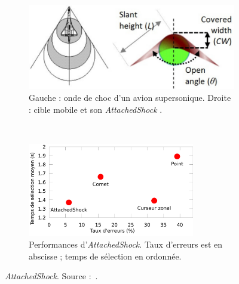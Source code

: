 	\begin{figure}[htbp]
		\centering
		\begin{subfigure}[t]{0.48\textwidth}
			\centering
			\includegraphics[width=\textwidth]{figures/ch2/asas}
			\caption{Gauche : onde de choc d'un avion supersonique. Droite : cible mobile et son \og \emph{AttachedShock} \fg{}.}
			\label{fig:asas}
		\end{subfigure}
		~
		\begin{subfigure}[t]{0.48\textwidth}
			\centering
			\includegraphics[width=0.8\textwidth]{figures/ch2/asRes}
			\caption{Performances d'\emph{AttachedShock}. Taux d'erreurs est en abscisse ; temps de sélection en ordonnée.}
			\label{fig:asRes}
		\end{subfigure}
		\caption{\emph{AttachedShock}. Source :~\cite{you2012attachedshock}.}
		\label{fig:asMain}
	\end{figure}
	
